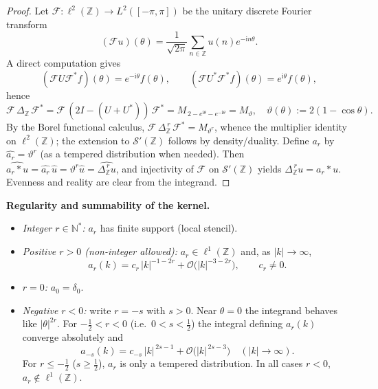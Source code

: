 \documentclass[10pt]{amsart} %
\newcommand{\Z}{{\mathbb{Z}}}
\newcommand{\1}{{\mathbb{I}}}
\newcommand{\Oc}{\mathcal{O}}
\numberwithin{equation}{section}
\begin{document}
\begin{proof}
Let $\mathcal F:\ell^2(\Z)\to L^2([-\pi,\pi])$ be the unitary discrete Fourier transform
\[
(\mathcal F u)(\theta)=\frac{1}{\sqrt{2\pi}}\sum_{n\in\Z}u(n)e^{-\mathrm{i}n\theta}.
\]
A direct computation gives
\[
(\mathcal F U \mathcal F^{*}f)(\theta)=e^{-\mathrm{i}\theta}f(\theta),\qquad
(\mathcal F U^{*} \mathcal F^{*}f)(\theta)=e^{\mathrm{i}\theta}f(\theta),
\]
hence
\begin{equation}\label{b-fourier}
\mathcal F\,\Delta_{\Z}\,\mathcal F^{*}
=\mathcal F\,(2I-(U+U^*))\,\mathcal F^{*}
=M_{\,2-e^{\mathrm{i}\theta}-e^{-\mathrm{i}\theta}}
=M_{\vartheta},\quad \vartheta(\theta):=2(1-\cos\theta).
\end{equation}
By the Borel functional calculus,
\(\mathcal F\,\Delta_{\Z}^{\,r}\,\mathcal F^{*}=M_{\vartheta^r}\),
whence the multiplier identity on $\ell^2(\Z)$; the extension to $\mathcal S'(\Z)$ follows by density/duality.
Define $a_r$ by $\widehat{a_r}=\vartheta^r$ (as a tempered distribution when needed). Then
\(\widehat{a_r*u}=\widehat{a_r}\,\widehat u=\vartheta^r\widehat u=\widehat{\Delta_\Z^{\,r}u}\),
and injectivity of $\mathcal F$ on $\mathcal S'(\Z)$ yields $\Delta_\Z^{\,r}u=a_r*u$.
Evenness and reality are clear from the integrand.
\end{proof}

\noindent\textbf{Regularity and summability of the kernel.}
\begin{itemize}
\item \emph{Integer $r\in\mathbb{N}^*$:} $a_r$ has finite support (local stencil).
\item \emph{Positive $r>0$ (non-integer allowed):} $a_r\in\ell^1(\mathbb{Z})$ and, as $|k|\to\infty$,
\[
a_r(k)=c_r\,|k|^{-1-2r}+\Oc \bigl(|k|^{-3-2r}\bigr),\qquad c_r\neq0.
\]
\item \emph{$r=0$:} $a_0=\delta_0$.
\item \emph{Negative $r<0$:} write $r=-s$ with $s>0$. Near $\theta=0$ the integrand behaves like $|\theta|^{2r}$.
For $-\tfrac{1}{2}<r<0$ (i.e.\ $0<s<\tfrac{1}{2}$) the integral defining $a_r(k)$ converge absolutely and
\[
a_{-s}(k)=c_{-s}\,|k|^{\,2s-1}+\Oc \bigl(|k|^{\,2s-3}\bigr)\quad(|k|\to\infty).
\]
For $r\le -\tfrac{1}{2}$ ($s\ge\tfrac12$), $a_r$ is only a tempered distribution. In all cases $r<0$, $a_r\notin\ell^1(\Z)$.
\end{itemize}
\end{document}
